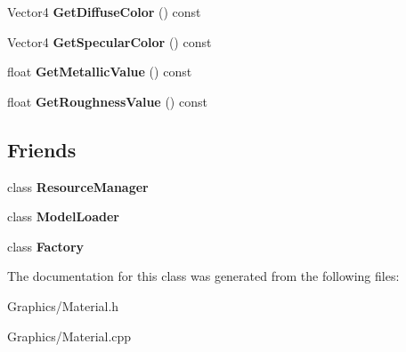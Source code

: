 \begin{DoxyCompactItemize}
Vector4 {\bfseries Get\+Diffuse\+Color} () const
\item 
\mbox{\label{classMaterial_af730a062421aa6a8cb85f24e6b7074da}} 
Vector4 {\bfseries Get\+Specular\+Color} () const
\item 
\mbox{\label{classMaterial_a491f2523cf8b159352c0137057c94212}} 
float {\bfseries Get\+Metallic\+Value} () const
\item 
\mbox{\label{classMaterial_a83d88169ada8d6094df872c1a0d82765}} 
float {\bfseries Get\+Roughness\+Value} () const
\end{DoxyCompactItemize}
\subsection*{Friends}
\begin{DoxyCompactItemize}
\item 
\mbox{\label{classMaterial_a54c1252abc87a78a301e6b6984470408}} 
class {\bfseries Resource\+Manager}
\item 
\mbox{\label{classMaterial_ac22dade55c1e8f81ea3e0892cd321190}} 
class {\bfseries Model\+Loader}
\item 
\mbox{\label{classMaterial_a328c093d609680cca505905c6d49901a}} 
class {\bfseries Factory}
\end{DoxyCompactItemize}


The documentation for this class was generated from the following files\+:\begin{DoxyCompactItemize}
\item 
Graphics/Material.\+h\item 
Graphics/Material.\+cpp\end{DoxyCompactItemize}
